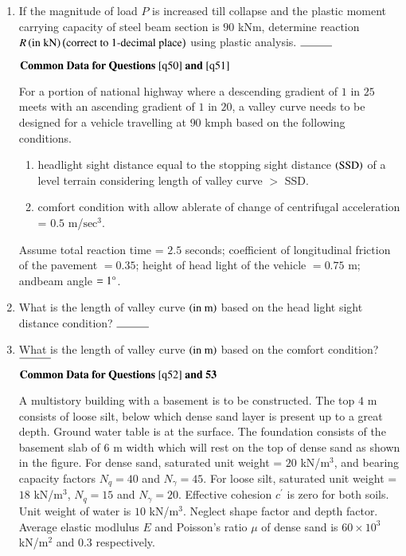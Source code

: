 \documentclass[journal,onecolumn]{IEEEtran}
\theoremstyle{remark}
\begin{document}
\begin{enumerate}
	\item \label{q49} If the magnitude of load $P$ is increased till collapse and the plastic moment carrying capacity of steel beam section is $90$ kNm, determine reaction $R \left(\text{in kN}\right) \left(\text{correct to } 1 \text{-decimal place}\right)$ using plastic analysis. $\rule{1cm}{0.15mm}$ 
	\hfill{}

	$\textbf{Common Data for Questions } \ref{q50} \textbf{ and } \ref{q51}$
	\newline

	For a portion of national highway where a descending gradient of $1$ in $25$ meets with an ascending gradient of $1$ in $20$, a valley curve needs to be designed for a vehicle travelling at $90$ kmph based on the following conditions.
	\begin{enumerate}
		\item headlight sight distance equal to the stopping sight distance $\left(\text{SSD}\right)$ of a level terrain considering length of valley curve $>$ SSD.
		\item comfort condition with allow ablerate of change of centrifugal acceleration = $0.5$ m/$\text{sec}^3$.
	\end{enumerate}
	Assume total reaction time = $2.5$ seconds; coefficient of longitudinal friction of the pavement $= 0.35$; height of head light of the vehicle $= 0.75$ m; andbeam angle $= 1\degree$. 

    \item \label{q50} What is the length of valley curve $\left(\text{in m}\right)$ based on the head light sight distance condition? $\rule{1cm}{0.15mm}$
	\hfill{}

    \item \label{q51}What is the length of valley curve $\left(\text{in m}\right)$ based on the comfort condition? $\rule{1cm}{0.15mm}$
	\hfill{}

	$\textbf{Common Data for Questions } \ref{q52} \textbf{ and 53}$
	\newline

	A multistory building with a basement is to be constructed. The top $4$ m consists of loose silt, below which dense sand layer is present up to a great depth. Ground water table is at the surface. The foundation consists of the basement slab of $6$ m width which will rest on the top of dense sand as shown in the figure. For dense sand, saturated unit weight = $20$ kN/$\text{m}^3$, and bearing capacity factors $N_q = 40$ and $N_{\gamma} = 45$. For loose silt, saturated unit weight = $18$ kN/$\text{m}^3$, $N_q = 15$ and $N_{\gamma} = 20$. Effective cohesion $c^{\prime}$ is zero for both soils. Unit weight of water is $10$ kN/$\text{m}^3$. Neglect shape factor and depth factor. 
	\newline
	Average elastic modlulus $E$ and Poisson's ratio $\mu$ of dense sand is $60 \times 10^3$ kN/$\text{m}^2$ and $0.3$ respectively.


\end{enumerate}
\end{document}
